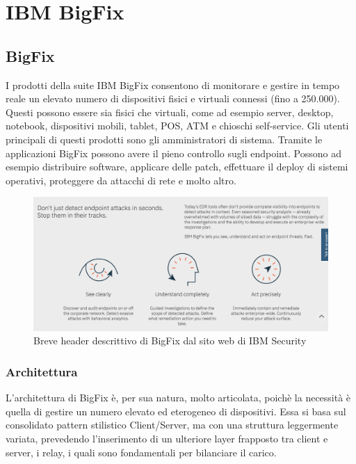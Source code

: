 \chapter{IBM BigFix}

\section{BigFix}
I prodotti della suite IBM BigFix consentono di monitorare e gestire in tempo reale un elevato numero di dispositivi fisici e virtuali connessi (fino a 250.000). Questi possono essere sia fisici che virtuali, come ad esempio server, desktop, notebook, dispositivi mobili, tablet, POS, ATM e chioschi self-service. Gli utenti principali di questi prodotti sono gli amministratori di sistema. Tramite le applicazioni BigFix possono avere il pieno controllo sugli endpoint. Possono ad esempio distribuire software, applicare delle patch, effettuare il deploy di sistemi operativi, proteggere da attacchi di rete e molto altro.
\begin{figure}[h!]
	\centering
	\includegraphics[width=\textwidth,keepaspectratio=true]{capitoli/imgs/BigFixManifest.png}
	\caption{Breve header descrittivo di BigFix dal sito web di IBM Security}
\end{figure}
\subsection{Architettura}
L'architettura di BigFix è, per sua natura, molto articolata, poichè la necessità è quella di gestire un numero elevato ed eterogeneo di dispositivi. Essa si basa sul consolidato pattern stilistico Client/Server, ma con una struttura leggermente variata, prevedendo l'inserimento di un ulteriore layer frapposto tra client e server, i relay, i quali sono fondamentali per bilanciare il carico.

